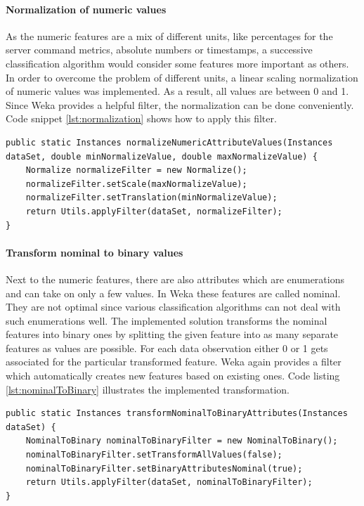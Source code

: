 \paragraph{Normalization of numeric values}
As the numeric features are a mix of different units, like percentages for the server command metrics, absolute numbers or timestamps, a successive classification algorithm would consider some features more important as others. In order to overcome the problem of different units, a linear scaling normalization of numeric values was implemented. As a result, all values are between 0 and 1. Since Weka provides a helpful filter, the normalization can be done conveniently. Code snippet \ref{lst:normalization} shows how to apply this filter.

\begin{lstlisting}[caption={Normalization of numeric feature values}, label={lst:normalization}]
public static Instances normalizeNumericAttributeValues(Instances dataSet, double minNormalizeValue, double maxNormalizeValue) {
	Normalize normalizeFilter = new Normalize();
	normalizeFilter.setScale(maxNormalizeValue);
	normalizeFilter.setTranslation(minNormalizeValue);
	return Utils.applyFilter(dataSet, normalizeFilter);
}
\end{lstlisting}

\paragraph{Transform nominal to binary values}
Next to the numeric features, there are also attributes which are enumerations and can take on only a few values. In Weka these features are called nominal. They are not optimal since various classification algorithms can not deal with such enumerations well. The implemented solution transforms the nominal features into binary ones by splitting the given feature into as many separate features as values are possible. For each data observation either 0 or 1 gets associated for the particular transformed feature. 
Weka again provides a filter which automatically creates new features based on existing ones. 
Code listing \ref{lst:nominalToBinary} illustrates the implemented transformation.

\begin{lstlisting}[caption={Transformation of nominal- to binary features}, label={lst:nominalToBinary}]
public static Instances transformNominalToBinaryAttributes(Instances dataSet) {
	NominalToBinary nominalToBinaryFilter = new NominalToBinary();
	nominalToBinaryFilter.setTransformAllValues(false);
	nominalToBinaryFilter.setBinaryAttributesNominal(true);
	return Utils.applyFilter(dataSet, nominalToBinaryFilter);
}
\end{lstlisting}

